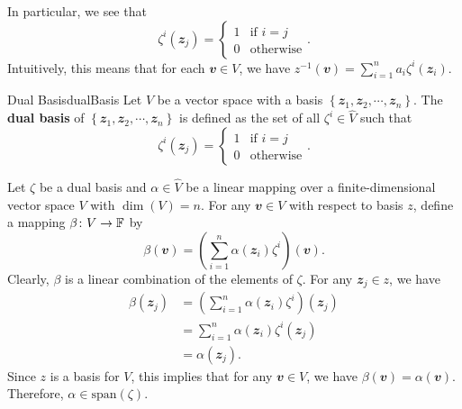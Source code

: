\documentclass[math, code]{amznotes}
\theoremstyle{remark}
\begin{document}
In particular, we see that
\begin{equation*}
    \zeta^i(\mathbfit{z}_j) = \begin{cases}
        1 & \textrm{if } i = j \\
        0 & \textrm{otherwise}
    \end{cases}.
\end{equation*}
Intuitively, this means that for each $\mathbfit{v} \in V$, we have $z^{-1}(\mathbfit{v}) = \sum_{i = 1}^{n}a_i\zeta^i(\mathbfit{z}_i)$.
\begin{dfnbox}{Dual Basis}{dualBasis}
    Let $V$ be a vector space with a basis $\left\{\mathbfit{z}_1, \mathbfit{z}_2, \cdots, \mathbfit{z}_n\right\}$. The {\color{red} \textbf{dual basis}} of $\left\{\mathbfit{z}_1, \mathbfit{z}_2, \cdots, \mathbfit{z}_n\right\}$ is defined as the set of all $\zeta^i \in \widehat{V}$ such that 
    \begin{equation*}
        \zeta^i(\mathbfit{z}_j) = \begin{cases}
            1 & \textrm{if } i = j \\
            0 & \textrm{otherwise}
        \end{cases}.
    \end{equation*}
\end{dfnbox}
Let $\zeta$ be a dual basis and $\alpha \in \widehat{V}$ be a linear mapping over a finite-dimensional vector space $V$ with $\dim(V) = n$. For any $\mathbfit{v} \in V$ with respect to basis $z$, define a mapping $\beta \colon V \to \mathbb{F}$ by 
\begin{equation*}
    \beta(\mathbfit{v}) = \left(\sum_{i = 1}^{n}\alpha(\mathbfit{z}_i)\zeta^i\right)(\mathbfit{v}).
\end{equation*}
Clearly, $\beta$ is a linear combination of the elements of $\zeta$. For any $\mathbfit{z}_j \in z$, we have
\begin{align*}
    \beta(\mathbfit{z}_j) & = \left(\sum_{i = 1}^{n}\alpha(\mathbfit{z}_i)\zeta^i\right)(\mathbfit{z}_j) \\
    & = \sum_{i = 1}^{n}\alpha(\mathbfit{z}_i)\zeta^i(\mathbfit{z}_j) \\
    & = \alpha(\mathbfit{z}_j).
\end{align*}
Since $z$ is a basis for $V$, this implies that for any $\mathbfit{v} \in V$, we have $\beta(\mathbfit{v}) = \alpha(\mathbfit{v})$. Therefore, $\alpha \in \mathrm{span}(\zeta)$. 
\end{document}
